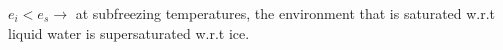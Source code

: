 \documentclass[fleqn,10pt]{SelfArx} %
\begin{document}
$e_i < e_s \rightarrow$ at subfreezing temperatures, the environment that is saturated w.r.t liquid water is supersaturated w.r.t ice.
\clearpage
%     
%
%
%
%
%
%
%
\end{document}
